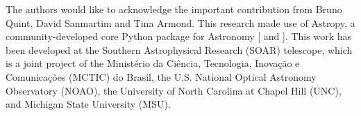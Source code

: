 \documentclass[11pt,twoside]{article}
\begin{document}
\acknowledgements The authors would like to acknowledge the important contribution from Bruno Quint, David Sanmartim and Tina Armond. This research made use of Astropy, a community-developed core Python package for Astronomy [ \citet{2013A&A...558A..33A} and \citet{2018AJ....156..123A} ]. This work has been developed at the Southern Astrophysical Research (SOAR) telescope, which is a joint project of the Minist\'erio da Ci\^encia, Tecnologia, Inova\c{c}\~ao e Comunica\c{c}\~oes (MCTIC) do Brasil, the U.S. National Optical Astronomy Observatory (NOAO), the University of North Carolina at Chapel Hill (UNC), and Michigan State University (MSU). 


\end{document}
